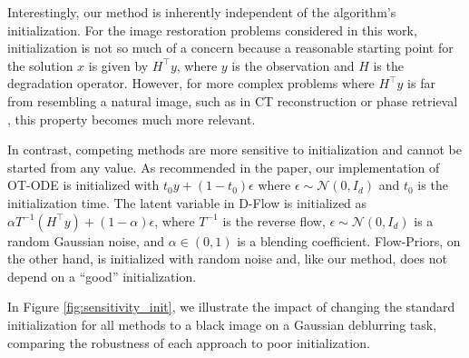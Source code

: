 \documentclass{article} %
\theoremstyle{definition}
\begin{document}
Interestingly, our method is inherently independent of the algorithm's initialization. For the image restoration problems considered in this work, initialization is not so much of a concern because a reasonable starting point for the solution $x$ is given by $H^\top y$, where $y$ is the observation and $H$ is the degradation operator. However, for more complex problems where $H^\top y$ is far from resembling a natural image, such as in CT reconstruction \citep{guo2016iterative} or phase retrieval \citep{manekar2020deep}, this property becomes much more relevant.

In contrast, competing methods are more sensitive to initialization and cannot be started from any value. As recommended in the paper, our implementation of OT-ODE is initialized with $t_0 y + (1-t_0) \epsilon$ where $\epsilon \sim \mathcal{N}(0,I_d)$ and $t_0$ is the initialization time. The latent variable in D-Flow is initialized as $\alpha T^{-1}(H^\top y) + (1-\alpha) \epsilon$,
where $T^{-1}$ is the reverse flow, $\epsilon \sim \mathcal{N}(0,I_d)$ is a random Gaussian noise, and $\alpha \in (0,1)$ is a blending coefficient. Flow-Priors, on the other hand, is initialized with random noise and, like our method, does not depend on a ``good'' initialization. 

In Figure \ref{fig:sensitivity_init}, we illustrate the impact of changing the standard initialization for all methods to a black image on a Gaussian deblurring task, comparing the robustness of each approach to poor initialization.
\end{document}
